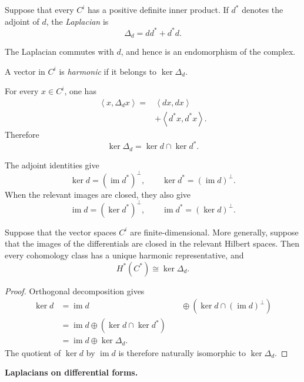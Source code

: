 \begin{definition}
\label{definition-laplacian-complex}
Suppose that every $C^i$ has a positive
definite inner product. If $d^*$ denotes
the adjoint of $d$, the {\it Laplacian} is
$$
\Delta_d=dd^*+d^*d.
$$
\end{definition}

The Laplacian commutes with $d$, and hence
is an endomorphism of the complex.

\begin{definition}
\label{definition-harmonic-vector}
A vector in $C^i$ is {\it harmonic} if it
belongs to $\ker\Delta_d$.
\end{definition}

For every $x\in C^i$, one has
$$
\begin{aligned}
\left\langle{}x,\Delta_dx
\right\rangle{}
={}&\left\langle{}dx,dx
\right\rangle{}\\
&+\left\langle{}d^*x,d^*x
\right\rangle{}.
\end{aligned}
$$
Therefore
$$
\ker\Delta_d=\ker d\cap\ker d^*.
$$

The adjoint identities give
$$
\ker d=(\operatorname{im}d^*)^\perp,
\qquad
\ker d^*=(\operatorname{im}d)^\perp.
$$
When the relevant images are closed, they
also give
$$
\operatorname{im}d
=(\ker d^*)^\perp,
\qquad
\operatorname{im}d^*
=(\ker d)^\perp.
$$

\begin{corollary}
\label{lemma-harmonic-representatives}
Suppose that the vector spaces $C^i$ are
finite-dimensional. More generally, suppose
that the images of the differentials are
closed in the relevant Hilbert spaces. Then
every cohomology class has a unique harmonic
representative, and
$$
H^*(C^*)\cong\ker\Delta_d.
$$
\end{corollary}

\begin{proof}
Orthogonal decomposition gives
$$
\begin{aligned}
\ker d
&=\operatorname{im}d
&\quad\oplus
(\ker d\cap(\operatorname{im}d)^\perp)\\
&=\operatorname{im}d
\oplus(\ker d\cap\ker d^*)\\
&=\operatorname{im}d
\oplus\ker\Delta_d.
\end{aligned}
$$
The quotient of $\ker d$ by
$\operatorname{im}d$ is therefore naturally
isomorphic to $\ker\Delta_d$.
\end{proof}

\medskip\noindent
{\bf Laplacians on differential forms.}

